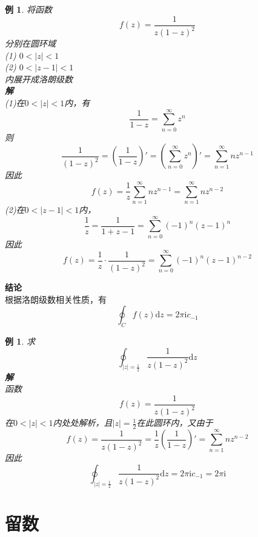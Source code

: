 \documentclass[12pt, a4paper, twoside]{ctexbook}
\newtheorem{example}[theorem]{例}
\begin{document}
\begin{example}
	将函数
	$$
	f\left(z\right)=\frac{1}{z\left(1-z\right)^2}
	$$
	\hspace*{2em}分别在圆环域\\
	\hspace*{2em}(1) $0<\left|z\right|<1$ \\
	\hspace*{2em}(2) $0<\left|z-1\right|<1$ \\
	\hspace*{2em}内展开成洛朗级数\\
	\hspace*{1em}\textbf{解}\\
	\hspace*{2em}(1)在$0<\left|z\right|<1$内，有
	$$
	\frac{1}{1-z}=\sum_{n=0}^{\infty}z^n
	$$
	\hspace*{2em}则
	$$
	\frac{1}{\left(1-z\right)^2}=\left(\frac{1}{1-z}\right)'=\left(\sum_{n=0}^{\infty}z^n\right)'=\sum_{n=1}^{\infty}nz^{n-1}
	$$
	\hspace*{2em}因此
	$$
	f\left(z\right)=\frac{1}{z}\sum_{n=1}^{\infty}nz^{n-1}=\sum_{n=1}^{\infty}nz^{n-2}
	$$
	\newpage
	(2)在$0<\left|z-1\right|<1$内，
	$$
	\frac{1}{z}=\frac{1}{1+z-1}=\sum_{n=0}^{\infty}\left(-1\right)^n\left(z-1\right)^n
	$$
	\hspace*{2em}因此
	$$
	f\left(z\right)=\frac{1}{z}\cdot\frac{1}{\left(1-z\right)^2}=\sum_{n=0}^{\infty}\left(-1\right)^n\left(z-1\right)^{n-2}
	$$
\end{example}
\textbf{结论}\\
根据洛朗级数相关性质，有
$$
\oint_C{f\left(z\right)\mathrm{d}z}=2\pi\mathrm{i}c_{-1}
$$
\begin{example}
	求
	$$
	\oint_{\left|z\right|=\frac{1}{2}}{\frac{1}{z\left(1-z\right)^2}\mathrm{d}z}
	$$
	\hspace*{1em}\textbf{解}\\
	\hspace*{2em}函数
	$$
	f\left(z\right)=\frac{1}{z\left(1-z\right)^2}
	$$
	\hspace*{2em}在$0<\left|z\right|<1$内处处解析，且$\left|z\right|=\frac{1}{2}$在此圆环内，又由于
	$$
	f\left(z\right)=\frac{1}{z\left(1-z\right)^2}=\frac{1}{z}\left(\frac{1}{1-z}\right)'=\sum_{n=1}^{\infty}nz^{n-2}
	$$
	\hspace*{2em}因此
	$$
	\oint_{\left|z\right|=\frac{1}{2}}{\frac{1}{z\left(1-z\right)^2}\mathrm{d}z}=2\pi\mathrm{i}c_{-1}=2\pi\mathrm{i}
	$$
\end{example}

\chapter{留数}
\newpage
\end{document}
